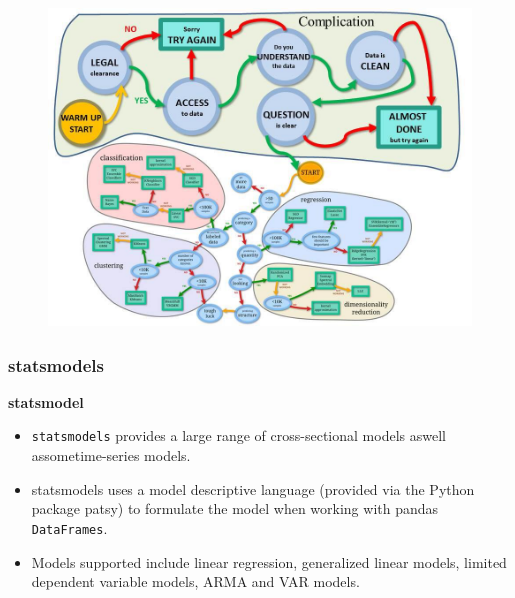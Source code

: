 \documentclass{beamer}
\begin{document}
\begin{frame}
	\begin{figure}
		\centering
		\includegraphics[width=0.9\linewidth]{SKLCheatSheet2}
		
	\end{figure}
\end{frame}


%


\begin{frame}
	\frametitle{statsmodels}
	\large
	\textbf{statsmodel}
	\begin{itemize}
		\item \texttt{statsmodels} provides a large range of cross-sectional models aswell assometime-series models. 
		\item statsmodels
		uses a model descriptive language (provided via the Python package patsy) to formulate the model
		when working with pandas \texttt{DataFrames}.
		\item Models supported include linear regression, generalized linear
		models, limited dependent variable models, ARMA and VAR models.
	\end{itemize}
\end{frame}

%
%

%





\end{document}
